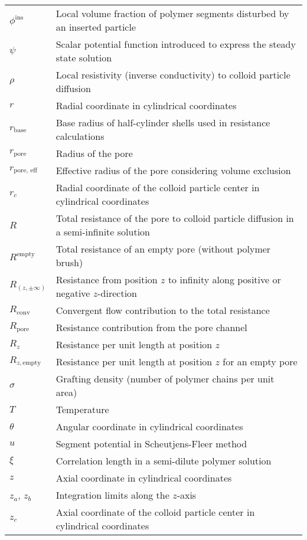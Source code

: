 \documentclass[10pt, a4paper]{article}
\begin{document}
\begin{tabularx}{\linewidth}{l X}
    $\phi^{\textrm{ins}}$ & Local volume fraction of polymer segments disturbed by an inserted particle \\
    $\psi$ & Scalar potential function introduced to express the steady state solution \\
    $\rho$ & Local resistivity (inverse conductivity) to colloid particle diffusion \\
    $r$ & Radial coordinate in cylindrical coordinates \\
    $r_{\textrm{base}}$ & Base radius of half-cylinder shells used in resistance calculations\\
    $r_{\textrm{pore}}$ & Radius of the pore \\
    $r_{\textrm{pore, eff}}$ & Effective radius of the pore considering volume exclusion \\
    $r_{c}$ & Radial coordinate of the colloid particle center in cylindrical coordinates \\
    $R$ & Total resistance of the pore to colloid particle diffusion in a semi-infinite solution \\
    $R^{\textrm{empty}}$ & Total resistance of an empty pore (without polymer brush) \\
    $R_{(z, \pm\infty)}$ & Resistance from position $z$ to infinity along positive or negative $z$-direction \\
    $R_{\textrm{conv}}$ & Convergent flow contribution to the total resistance \\
    $R_{\textrm{pore}}$ & Resistance contribution from the pore channel \\
    $R_{z}$ & Resistance per unit length at position $z$ \\
    $R_{z, \textrm{empty}}$ & Resistance per unit length at position $z$ for an empty pore \\
    $\sigma$ & Grafting density (number of polymer chains per unit area) \\
    $T$ & Temperature \\
    $\theta$ & Angular coordinate in cylindrical coordinates \\
    $u$ & Segment potential in Scheutjens-Fleer method\\
    $\xi$ & Correlation length in a semi-dilute polymer solution \\
    $z$ & Axial coordinate in cylindrical coordinates \\
    $z_a$, $z_b$ & Integration limits along the $z$-axis \\
    $z_{c}$ & Axial coordinate of the colloid particle center in cylindrical coordinates \\

\end{tabularx}
\end{document}
